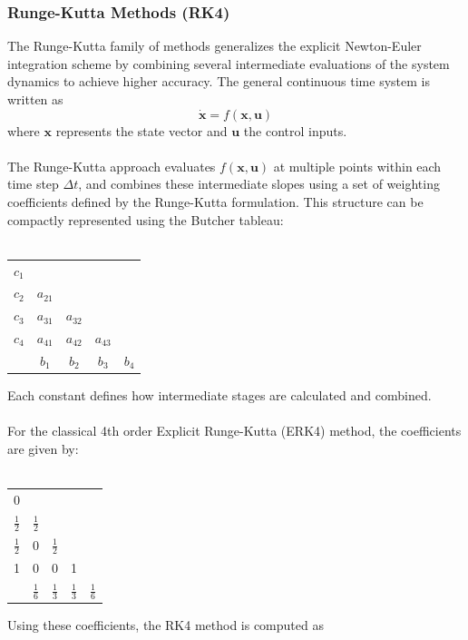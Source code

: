 \subsubsection{Runge-Kutta Methods (RK4)}
The Runge-Kutta family of methods generalizes the explicit Newton-Euler integration scheme by combining several intermediate evaluations of the system dynamics to achieve higher accuracy. The general continuous time system is written as
$$
    \dot{\mathbf{x}} = f(\mathbf{x}, \mathbf{u})
$$
where $\mathbf{x}$ represents the state vector and $\mathbf{u}$ the control inputs.  
\\ \\
The Runge-Kutta approach evaluates $f(\mathbf{x}, \mathbf{u})$ at multiple points within each time step $\Delta t$, and combines these intermediate slopes using a set of weighting coefficients defined by the Runge-Kutta formulation. This structure can be compactly represented using the Butcher tableau:
\\ \\
\begin{center}
    \begin{tabular}{c|cccc}
        $c_1$ &  \\
        $c_2$ & $a_{21}$ \\
        $c_3$ & $a_{31}$ & $a_{32}$ \\
        $c_4$ & $a_{41}$ & $a_{42}$ & $a_{43}$ \\ \hline
        & $b_1$ & $b_2$ & $b_3$ & $b_4$
    \end{tabular}
\end{center}
Each constant defines how intermediate stages are calculated and combined.  
\\ \\
For the classical 4th order Explicit Runge-Kutta (ERK4) method, the coefficients are given by:
\\ \\
\begin{center}
    \begin{tabular}{c|cccc}
        0 &  \\
        $\tfrac{1}{2}$ & $\tfrac{1}{2}$ \\
        $\tfrac{1}{2}$ & 0 & $\tfrac{1}{2}$ \\
        1 & 0 & 0 & 1 \\ \hline
        & $\tfrac{1}{6}$ & $\tfrac{1}{3}$ & $\tfrac{1}{3}$ & $\tfrac{1}{6}$
    \end{tabular}
\end{center}
Using these coefficients, the RK4 method is computed as
